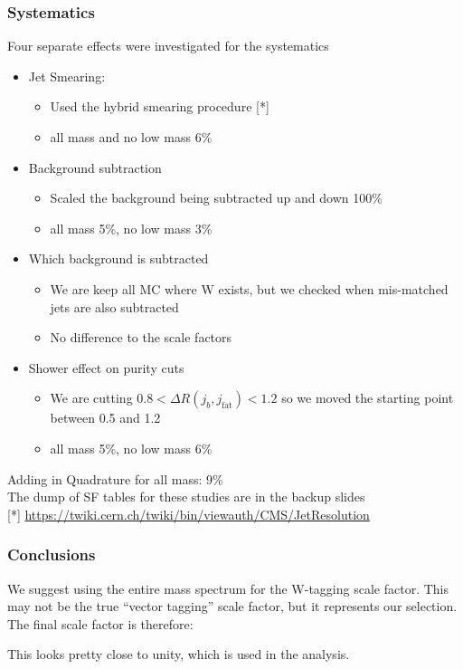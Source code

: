 \documentclass{beamer}
\begin{document}
\begin{frame}
  \frametitle{Systematics}
 Four separate effects were investigated for the systematics
  \begin{itemize}
  \item Jet Smearing: 
    \begin{itemize}
    \item Used the hybrid smearing procedure [*] \\
    \item all mass and no low mass 6\%
    \end{itemize}
  \item Background subtraction
    \begin{itemize}
    \item Scaled the background being subtracted up and down 100\%
    \item all mass 5\%, no low mass 3\%
    \end{itemize}
  \item Which background is subtracted
    \begin{itemize}
      \item We are keep all MC where W exists, but we checked when mis-matched jets
        are also subtracted
      \item No difference to the scale factors
    \end{itemize}
  \item Shower effect on purity cuts
    \begin{itemize}
      \item We are cutting $0.8 < \Delta R(j_b,j_\text{fat}) < 1.2$
        so we moved the starting point between 0.5 and 1.2
      \item all mass 5\%, no low mass 6\%
    \end{itemize}
  \end{itemize}
  Adding in Quadrature for all mass: 9\% \\
  The dump of SF tables for these studies are in the backup slides \\
  \vspace{12pt}
  {\small [*] 
    \href{https://twiki.cern.ch/twiki/bin/viewauth/CMS/JetResolution#Smearing_procedures}
         {https://twiki.cern.ch/twiki/bin/viewauth/CMS/JetResolution}}
\end{frame}

\begin{frame}
  \frametitle{Conclusions}
  We suggest using the entire mass spectrum for the W-tagging scale factor.
  This may not be the true ``vector tagging'' scale factor, but it represents our selection.
  The final scale factor is therefore: \\
  
  \begin{center}
  \end{center}

  This looks pretty close to unity, which is used in the analysis.
\end{frame}
\end{document}

